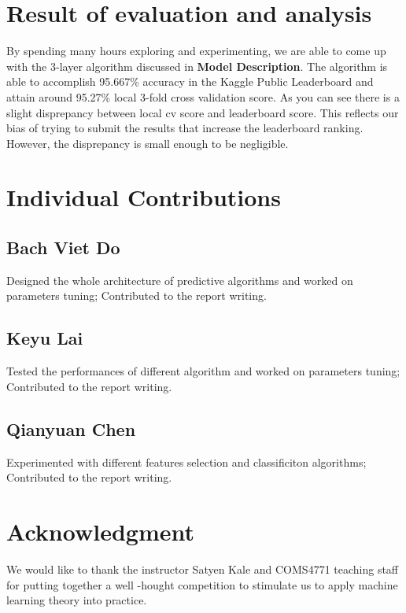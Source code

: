 \documentclass[conference]{IEEEtran}
\begin{document}
\section{Result of evaluation and analysis}
By spending many hours exploring and experimenting, we are able to come up with the 3-layer algorithm discussed in \textbf{Model Description}. The algorithm is able to accomplish 95.667\% accuracy in the Kaggle Public Leaderboard and attain around 95.27\% local 3-fold cross validation score. As you can see there is a slight disprepancy between local cv score and leaderboard score. This reflects our bias of trying to submit the results that increase the leaderboard ranking. However, the disprepancy is small enough to be negligible.

\section{Individual Contributions}
\subsection{Bach Viet Do}
Designed the whole architecture of predictive algorithms and worked on parameters tuning; Contributed to the report writing. 
\subsection{Keyu Lai}
Tested the performances of different algorithm and worked on parameters tuning; Contributed to the report writing. 
\subsection{Qianyuan Chen}
Experimented with different features selection and classificiton algorithms; Contributed to the report writing. 

\section*{Acknowledgment}
We would like to thank the instructor Satyen Kale and COMS4771 teaching staff for putting together a well -hought competition to stimulate us to apply machine learning theory into practice.





\end{document}
